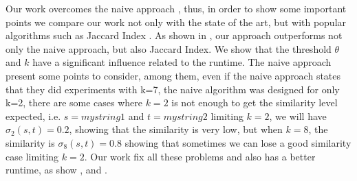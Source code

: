 Our work overcomes the naive approach \cite{seker2014novel}, thus, in order to show some important points we compare our work not only with the state of the art, but with popular algorithms such as Jaccard Index \cite{jaccard1912distribution}.
As shown in , our approach outperforms not only the naive approach, but also Jaccard Index. We show that the threshold $\theta$ and $k$ have a significant influence related to the runtime.
The naive approach present some points to consider, among them, even if the naive approach states that they did experiments with k=7, the naive algorithm was designed for only k=2, there are some cases where $k=2$ is not enough to get the similarity level expected, i.e. $s=mystring1$ and $t=mystring2$ limiting $k=2$, we will have $\sigma_2(s,t)=0.2$, showing that the similarity is very low, but when $k=8$, the similarity is $\sigma_8(s,t)=0.8$ showing that sometimes we can lose a good similarity case limiting $k=2$.
Our work fix all these problems and also has a better runtime, as show ,  and .


		
		
		


